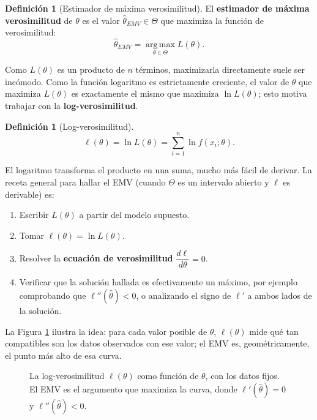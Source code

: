 \documentclass[11pt,a4paper]{article}
\theoremstyle{plain}
\theoremstyle{definition}
\newtheorem{definicion}[teorema]{Definición}
\theoremstyle{remark}
\begin{document}
\begin{definicion}[Estimador de máxima verosimilitud]
El \textbf{estimador de máxima verosimilitud} de $\theta$ es el valor $\widehat\theta_{EMV}\in\Theta$ que maximiza la función de verosimilitud:
\[
\widehat\theta_{EMV} = \operatorname*{arg\,max}_{\theta\in\Theta} L(\theta).
\]
\end{definicion}

Como $L(\theta)$ es un producto de $n$ términos, maximizarla directamente suele ser incómodo. Como la función logaritmo es estrictamente creciente, el valor de $\theta$ que maximiza $L(\theta)$ es exactamente el mismo que maximiza $\ln L(\theta)$; esto motiva trabajar con la \textbf{log-verosimilitud}.

\begin{definicion}[Log-verosimilitud]
\[
\ell(\theta) = \ln L(\theta) = \sum_{i=1}^n \ln f(x_i;\theta).
\]
\end{definicion}

El logaritmo transforma el producto en una suma, mucho más fácil de derivar. La receta general para hallar el EMV (cuando $\Theta$ es un intervalo abierto y $\ell$ es derivable) es:
\begin{enumerate}[label=\arabic*)]
\item Escribir $L(\theta)$ a partir del modelo supuesto.
\item Tomar $\ell(\theta)=\ln L(\theta)$.
\item Resolver la \textbf{ecuación de verosimilitud} $\dfrac{d\ell}{d\theta}=0$.
\item Verificar que la solución hallada es efectivamente un máximo, por ejemplo comprobando que $\ell''(\widehat\theta)<0$, o analizando el signo de $\ell'$ a ambos lados de la solución.
\end{enumerate}

La Figura \ref{fig:verosim} ilustra la idea: para cada valor posible de $\theta$, $\ell(\theta)$ mide qué tan compatibles son los datos observados con ese valor; el EMV es, geométricamente, el punto más alto de esa curva.

\begin{figure}[h]
\centering
{}
\caption{La log-verosimilitud $\ell(\theta)$ como función de $\theta$, con los datos fijos. El EMV es el argumento que maximiza la curva, donde $\ell'(\widehat\theta)=0$ y $\ell''(\widehat\theta)<0$.}
\label{fig:verosim}
\end{figure}
\end{document}
